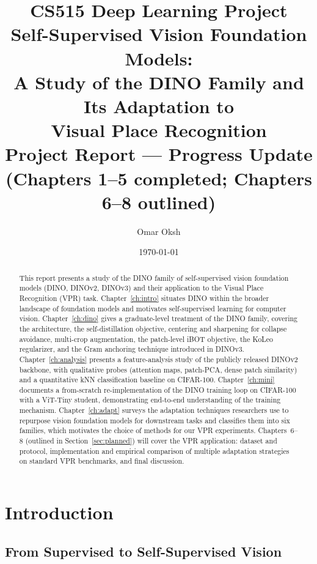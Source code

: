 \documentclass[11pt,a4paper]{article}
\title{\vspace{-2em}
\textbf{CS515 Deep Learning Project}\\[0.3em]
\large Self-Supervised Vision Foundation Models:\\
A Study of the DINO Family and Its Adaptation to\\
Visual Place Recognition\\[0.5em]
\large Project Report --- Progress Update\\
\small (Chapters 1--5 completed; Chapters 6--8 outlined)}
\author{Omar Oksh}
\date{\today}
\begin{document}
\maketitle

\begin{abstract}
This report presents a study of the DINO family of self-supervised vision
foundation models (DINO, DINOv2, DINOv3) and their application to the Visual
Place Recognition (VPR) task. Chapter~\ref{ch:intro} situates DINO within
the broader landscape of foundation models and motivates self-supervised
learning for computer vision. Chapter~\ref{ch:dino} gives a graduate-level
treatment of the DINO family, covering the architecture, the self-distillation
objective, centering and sharpening for collapse avoidance, multi-crop
augmentation, the patch-level iBOT objective, the KoLeo regularizer, and the
Gram anchoring technique introduced in DINOv3. Chapter~\ref{ch:analysis}
presents a feature-analysis study of the publicly released DINOv2 backbone,
with qualitative probes (attention maps, patch-PCA, dense patch similarity)
and a quantitative kNN classification baseline on CIFAR-100.
Chapter~\ref{ch:mini} documents a from-scratch re-implementation of the DINO
training loop on CIFAR-100 with a ViT-Tiny student, demonstrating
end-to-end understanding of the training mechanism. Chapter~\ref{ch:adapt}
surveys the adaptation techniques researchers use to repurpose
vision foundation models for downstream tasks and classifies them into
six families, which motivates the choice of methods for our VPR experiments.
Chapters~6--8 (outlined in Section~\ref{sec:planned}) will cover the VPR
application: dataset and protocol, implementation and empirical comparison
of multiple adaptation strategies on standard VPR benchmarks, and final
discussion.
\end{abstract}

\tableofcontents
\newpage

\section{Introduction}
\label{ch:intro}

\subsection{From Supervised to Self-Supervised Vision}
\end{document}
